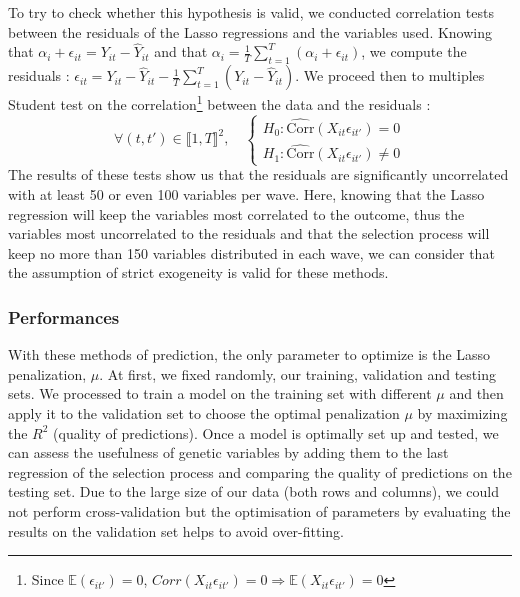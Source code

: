 \documentclass[]{article}
\begin{document}
\noindent
To try to check whether this hypothesis is valid, we conducted correlation tests between the residuals of the Lasso regressions and the variables used. Knowing that $\alpha_i + \epsilon_{it} = {Y}_{it} - \hat{Y}_{it}$ and that $\alpha_i = \frac{1}{T} \sum_{t=1}^T (\alpha_i + \epsilon_{it} )$, we compute the residuals : $\epsilon_{it} = {Y}_{it} - \hat{Y}_{it} - \frac{1}{T} \sum_{t=1}^T ({Y}_{it} - \hat{Y}_{it} )$. We proceed then to multiples Student test on the correlation\footnote{Since $\mathbb{E}(\epsilon_{it'}) = 0$, $Corr(X_{it}\epsilon_{it'}) = 0 \Longrightarrow \mathbb{E}(X_{it}\epsilon_{it'}) = 0$} between the data and the residuals : 
\begin{equation}
	\forall (t,t')\in \llbracket1,T\rrbracket^2,\quad \left\{
	\begin{array}{ll}
		H_0 : \widehat{\mathrm{Corr}}(X_{it}\epsilon_{it'}) = 0\\
		H_1 : \widehat{\mathrm{Corr}}(X_{it}\epsilon_{it'}) \ne 0
	\end{array}
	\right.
\end{equation}
The results of these tests show us that the residuals are significantly uncorrelated with at least 50 or even 100 variables per wave. Here, knowing that the Lasso regression will keep the variables most correlated to the outcome, thus the variables most uncorrelated to the residuals and that the selection process will keep no more than 150 variables distributed in each wave, we can consider that the assumption of strict exogeneity is valid for these methods.

\subsubsection{Performances}


With these methods of prediction, the only parameter to optimize is the Lasso penalization, $\mu$. At first, we fixed randomly, our training, validation and testing sets. We processed to train a model on the training set with different $\mu$ and then apply it to the validation set to choose the optimal penalization $\mu$ by maximizing the $R^2$ (quality of predictions). Once a model is optimally set up and tested, we can assess the usefulness of genetic variables by adding them to the last regression of the selection process and comparing the quality of predictions on the testing set. Due to the large size of our data (both rows and columns), we could not perform cross-validation but the optimisation of parameters by evaluating the results on the validation set helps to avoid over-fitting.\\
\end{document}
